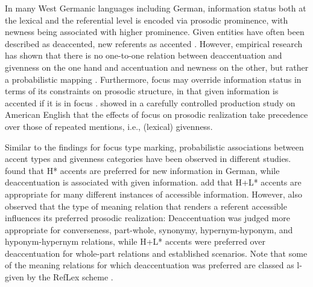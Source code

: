 In many West Germanic languages including German, information status both at the lexical and the referential level is encoded via prosodic prominence, with newness being associated with higher prominence. Given entities have often been described as deaccented, new referents as accented \citep{hallidayNotesTransitivityTheme1967, cruttendenDeaccentingGivenInformation2006, laddIntonationalPhonology2008}. However, empirical research has shown that there is no one-to-one relation between deaccentuation and givenness on the one hand and accentuation and newness on the other, but rather a probabilistic mapping \citep[e.g.,][]{terkenDeaccentuationWordsRepresenting1994, bakerVariabilityWordDuration2009, calhounCentralityMetricalStructure2010, baumannCoreferenceLexicalGivenness2013}. Furthermore, focus may override information status in terms of its constraints on prosodic structure, in that given information is accented if it is in focus \citep[264]{krifkaBasicNotionsInformation2008}. \citet{wagnerAccessibilityNoAlternative2015} showed in a carefully controlled production study on American English that the effects of focus on prosodic realization take precedence over those of repeated mentions, i.e., (lexical) givenness. 

Similar to the findings for focus type marking, probabilistic associations between accent types and givenness categories have been observed in different studies. \citet{baumannAccentTypeGivenness2003} found that H* accents are preferred for new information in German, while deaccentuation is associated with given information. \citet{baumannIntonationAccessibility2006} add that H+L* accents are appropriate for many different instances of accessible information. However, \citet{baumannIntonationAccessibility2006} also observed that the type of meaning relation that renders a referent accessible influences its preferred prosodic realization: Deaccentuation was judged more appropriate for converseness, part-whole, synonymy, hypernym-hyponym, and hyponym-hypernym relations, while H+L* accents were preferred over deaccentuation for whole-part relations and established scenarios. Note that some of the meaning relations for which deaccentuation was preferred are classed as l-given by the RefLex scheme \citep{riesterRefLexSchemeAnnotation2017}.


